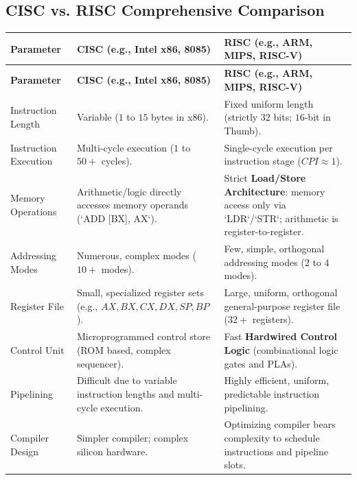 \documentclass[12pt,a4paper]{article}
\begin{document}
\subsection{CISC vs. RISC Comprehensive Comparison}
\par\vspace{6pt}
\begingroup
\setlength{\extrarowheight}{2.5pt}
\setlength{\LTleft}{0pt}
\setlength{\LTright}{0pt}
\begin{longtable}{|B{3.2cm}|>{\small\raggedright\arraybackslash}m{\dimexpr(\linewidth-3.2cm-6\arrayrulewidth)/2\relax}|>{\small\raggedright\arraybackslash}m{\dimexpr(\linewidth-3.2cm-6\arrayrulewidth)/2\relax}|}
\hline
\textbf{Parameter} & \textbf{CISC (e.g., Intel x86, 8085)} & \textbf{RISC (e.g., ARM, MIPS, RISC-V)} \\ \hline
\endfirsthead
\hline
\textbf{Parameter} & \textbf{CISC (e.g., Intel x86, 8085)} & \textbf{RISC (e.g., ARM, MIPS, RISC-V)} \\ \hline
\endhead
Instruction Length & Variable ($1$ to $15$ bytes in x86). & Fixed uniform length (strictly $32$ bits; $16$-bit in Thumb). \\ \hline
Instruction Execution & Multi-cycle execution ($1$ to $50+$ cycles). & Single-cycle execution per instruction stage ($CPI \approx 1$). \\ \hline
Memory Operations & Arithmetic/logic directly accesses memory operands (`ADD [BX], AX`). & Strict \textbf{Load/Store Architecture}: memory access only via `LDR`/`STR`; arithmetic is register-to-register. \\ \hline
Addressing Modes & Numerous, complex modes ($10+$ modes). & Few, simple, orthogonal addressing modes ($2$ to $4$ modes). \\ \hline
Register File & Small, specialized register sets (e.g., $AX, BX, CX, DX, SP, BP$). & Large, uniform, orthogonal general-purpose register file ($32+$ registers). \\ \hline
Control Unit & Microprogrammed control store (ROM based, complex sequencer). & Fast \textbf{Hardwired Control Logic} (combinational logic gates and PLAs). \\ \hline
Pipelining & Difficult due to variable instruction lengths and multi-cycle execution. & Highly efficient, uniform, predictable instruction pipelining. \\ \hline
Compiler Design & Simpler compiler; complex silicon hardware. & Optimizing compiler bears complexity to schedule instructions and pipeline slots. \\ \hline
\end{longtable}
\endgroup
\end{document}
